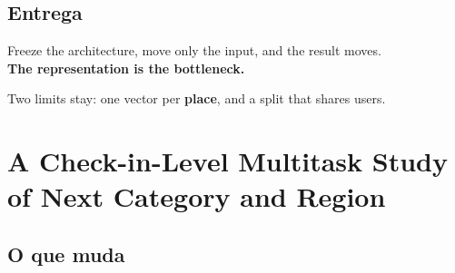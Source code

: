 \documentclass{beamer}
\begin{document}
\subsection{Entrega}

{
\specialframe
\begin{frame}
    \vfill
    \begin{center}
        {\Large Freeze the architecture, move only the input, and the result moves.\\[1mm]
        \textbf{The representation is the bottleneck.}}

        \bigskip
        {\normalsize Two limits stay: one vector per \textbf{place}, and a split that shares users.}
    \end{center}
    \vfill
\end{frame}
}

\section[Check2HGI]{A Check-in-Level Multitask Study of Next Category and Region}


\subsection{O que muda}
\end{document}
